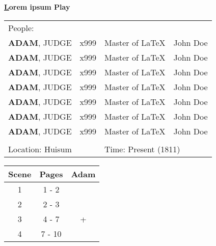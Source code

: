 \documentclass[10pt]{article}
\newcommand{\PlayTitle}{Lorem ipsum Play}
\newcommand{\TitlePageLineBold}[3]{\fontsize{#1}{#2}\selectfont \textbf{#3} \par}
\begin{document}
\begin{titlepage}
\begin{flushleft}
\TitlePageLineBold{26pt}{26pt}{\ul\PlayTitle}
\vspace{0.5cm}



\begin{table}[H] %
\begin{tabular}{p{4cm} p{5cm} p{3cm} p{2cm}}
People:& & & \\
\textbf{ADAM}, JUDGE & x999 & Master of LaTeX & John Doe \\
\textbf{ADAM}, JUDGE & x999 & Master of LaTeX & John Doe \\
\textbf{ADAM}, JUDGE & x999 & Master of LaTeX & John Doe \\
\textbf{ADAM}, JUDGE & x999 & Master of LaTeX & John Doe \\
\textbf{ADAM}, JUDGE & x999 & Master of LaTeX & John Doe \\
\textbf{ADAM}, JUDGE & x999 & Master of LaTeX & John Doe \\
\textbf{ADAM}, JUDGE & x999 & Master of LaTeX & John Doe \\
& & & \\
\multicolumn{2}{l}{Location: Huisum} &\multicolumn{2}{l}{Time: Present (1811)} \\

\end{tabular}
\end{table}


\begin{table}[H] %
\begin{tabular}{|c|c|c|}
\hline
Scene & Pages & Adam \\ \hline
1 & 1 - 2 & \cellcolor{TableColorAppearance} \\ \hline
2 & 2 - 3 & \\ \hline
3 & 4 - 7 & \cellcolor{TableColorSemiAppearance} + \\ \hline
4 & 7 - 10 & \\ \hline

\end{tabular}
\end{table}

\end{flushleft}
\end{titlepage}
\end{document}
